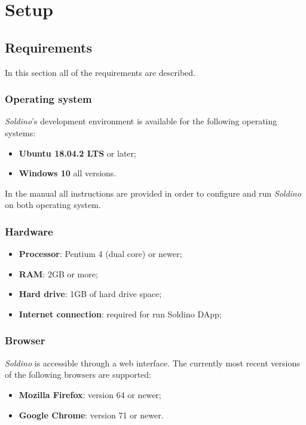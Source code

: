 \section{Setup} 
\subsection{Requirements}
In this section all of the requirements are described.
\subsubsection{Operating system}
\textit{Soldino}'s development environment is available for the following operating systems:
\begin{itemize}
	\item\textbf{Ubuntu 18.04.2 LTS} or later;
	\item\textbf{Windows 10} all versions.
\end{itemize}
In the manual all instructions are provided in order to configure and run \textit{Soldino} on both operating system.
\subsubsection{Hardware}
 
\begin{itemize}
	\item  \textbf{Processor}: Pentium 4 (dual core) or newer;
	\item \textbf{RAM}: 2GB or more;
	\item \textbf{Hard drive}: 1GB of hard drive space;
	\item \textbf{Internet connection}: required for run Soldino DApp;
\end{itemize}

\subsubsection{Browser}
\textit{Soldino} is accessible through a web interface. The currently most 
recent versions of the following browsers are supported:
\begin{itemize}
	\item \textbf{Mozilla Firefox}: version 64 or newer;
	\item \textbf{Google Chrome}: version 71 or newer.
\end{itemize}

